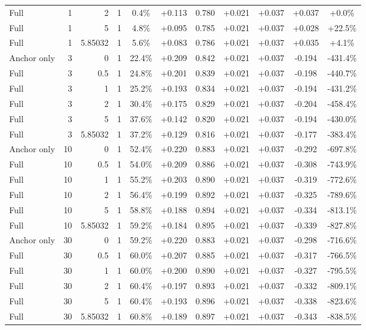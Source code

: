 \begin{table}[htbp]
\begin{tabular}{lrrrccccccc}
Full & 1 & 2 & 1 & 0.4\% & +0.113 & 0.780 & +0.021 & +0.037 & +0.037 & +0.0\% \\
Full & 1 & 5 & 1 & 4.8\% & +0.095 & 0.785 & +0.021 & +0.037 & +0.028 & +22.5\% \\
Full & 1 & 5.85032 & 1 & 5.6\% & +0.083 & 0.786 & +0.021 & +0.037 & +0.035 & +4.1\% \\
Anchor only & 3 & 0 & 1 & 22.4\% & +0.209 & 0.842 & +0.021 & +0.037 & -0.194 & -431.4\% \\
Full & 3 & 0.5 & 1 & 24.8\% & +0.201 & 0.839 & +0.021 & +0.037 & -0.198 & -440.7\% \\
Full & 3 & 1 & 1 & 25.2\% & +0.193 & 0.834 & +0.021 & +0.037 & -0.194 & -431.2\% \\
Full & 3 & 2 & 1 & 30.4\% & +0.175 & 0.829 & +0.021 & +0.037 & -0.204 & -458.4\% \\
Full & 3 & 5 & 1 & 37.6\% & +0.142 & 0.820 & +0.021 & +0.037 & -0.194 & -430.0\% \\
Full & 3 & 5.85032 & 1 & 37.2\% & +0.129 & 0.816 & +0.021 & +0.037 & -0.177 & -383.4\% \\
Anchor only & 10 & 0 & 1 & 52.4\% & +0.220 & 0.883 & +0.021 & +0.037 & -0.292 & -697.8\% \\
Full & 10 & 0.5 & 1 & 54.0\% & +0.209 & 0.886 & +0.021 & +0.037 & -0.308 & -743.9\% \\
Full & 10 & 1 & 1 & 55.2\% & +0.203 & 0.890 & +0.021 & +0.037 & -0.319 & -772.6\% \\
Full & 10 & 2 & 1 & 56.4\% & +0.199 & 0.892 & +0.021 & +0.037 & -0.325 & -789.6\% \\
Full & 10 & 5 & 1 & 58.8\% & +0.188 & 0.894 & +0.021 & +0.037 & -0.334 & -813.1\% \\
Full & 10 & 5.85032 & 1 & 59.2\% & +0.184 & 0.895 & +0.021 & +0.037 & -0.339 & -827.8\% \\
Anchor only & 30 & 0 & 1 & 59.2\% & +0.220 & 0.883 & +0.021 & +0.037 & -0.298 & -716.6\% \\
Full & 30 & 0.5 & 1 & 60.0\% & +0.207 & 0.885 & +0.021 & +0.037 & -0.317 & -766.5\% \\
Full & 30 & 1 & 1 & 60.0\% & +0.200 & 0.890 & +0.021 & +0.037 & -0.327 & -795.5\% \\
Full & 30 & 2 & 1 & 60.4\% & +0.197 & 0.893 & +0.021 & +0.037 & -0.332 & -809.1\% \\
Full & 30 & 5 & 1 & 60.4\% & +0.193 & 0.896 & +0.021 & +0.037 & -0.338 & -823.6\% \\
Full & 30 & 5.85032 & 1 & 60.8\% & +0.189 & 0.897 & +0.021 & +0.037 & -0.343 & -838.5\% \\

\end{tabular}
\end{table}
